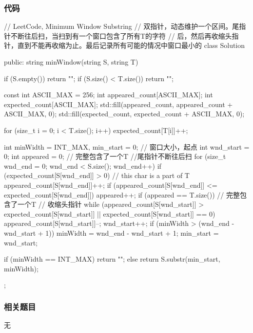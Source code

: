\subsubsection{代码}
\begin{Code}
// LeetCode, Minimum Window Substring
// 双指针，动态维护一个区间。尾指针不断往后扫，当扫到有一个窗口包含了所有T的字符
// 后，然后再收缩头指针，直到不能再收缩为止。最后记录所有可能的情况中窗口最小的
class Solution {
public:
    string minWindow(string S, string T) {
        if (S.empty()) return "";
        if (S.size() < T.size()) return "";

        const int ASCII_MAX = 256;
        int appeared_count[ASCII_MAX];
        int expected_count[ASCII_MAX];
        std::fill(appeared_count, appeared_count + ASCII_MAX, 0);
        std::fill(expected_count, expected_count + ASCII_MAX, 0);

        for (size_t i = 0; i < T.size(); i++) expected_count[T[i]]++;

        int minWidth = INT_MAX, min_start = 0;  // 窗口大小，起点
        int wnd_start = 0;
        int appeared = 0;  // 完整包含了一个T
        //尾指针不断往后扫
        for (size_t wnd_end = 0; wnd_end < S.size(); wnd_end++) {
            if (expected_count[S[wnd_end]] > 0)  {  // this char is a part of T
                appeared_count[S[wnd_end]]++;
                if (appeared_count[S[wnd_end]] <= expected_count[S[wnd_end]])
                    appeared++;
            }
            if (appeared == T.size()) {  // 完整包含了一个T
                // 收缩头指针
                while (appeared_count[S[wnd_start]] > expected_count[S[wnd_start]]
                        || expected_count[S[wnd_start]] == 0) {
                    appeared_count[S[wnd_start]]--;
                    wnd_start++;
                }
                if (minWidth > (wnd_end - wnd_start + 1)) {
                    minWidth = wnd_end - wnd_start + 1;
                    min_start = wnd_start;
                }
            }
        }

        if (minWidth == INT_MAX) return "";
        else return S.substr(min_start, minWidth);
    }
};
\end{Code}


\subsubsection{相关题目}

\begindot
\item 无
\myenddot


